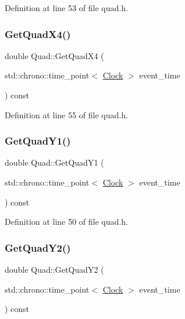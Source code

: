 Definition at line 53 of file quad.\+h.

\mbox{\label{class_quad_a07884076387e255aa09ca8b0ac7ff599}} 
\subsubsection{\texorpdfstring{Get\+Quad\+X4()}{GetQuadX4()}}
{\footnotesize\ttfamily double Quad\+::\+Get\+Quad\+X4 (\begin{DoxyParamCaption}\item[{std\+::chrono\+::time\+\_\+point$<$ \hyperlink{universe_8h_a0ef8d951d1ca5ab3cfaf7ab4c7a6fd80}{Clock} $>$}]{event\+\_\+time }\end{DoxyParamCaption}) const\hspace{0.3cm}{\ttfamily [inline]}}



Definition at line 55 of file quad.\+h.

\mbox{\label{class_quad_ac7b0d27994149531dcd81eacca4e1a5c}} 
\subsubsection{\texorpdfstring{Get\+Quad\+Y1()}{GetQuadY1()}}
{\footnotesize\ttfamily double Quad\+::\+Get\+Quad\+Y1 (\begin{DoxyParamCaption}\item[{std\+::chrono\+::time\+\_\+point$<$ \hyperlink{universe_8h_a0ef8d951d1ca5ab3cfaf7ab4c7a6fd80}{Clock} $>$}]{event\+\_\+time }\end{DoxyParamCaption}) const\hspace{0.3cm}{\ttfamily [inline]}}



Definition at line 50 of file quad.\+h.

\mbox{\label{class_quad_a8f10730993f6c6310f18431a81fb352a}} 
\subsubsection{\texorpdfstring{Get\+Quad\+Y2()}{GetQuadY2()}}
{\footnotesize\ttfamily double Quad\+::\+Get\+Quad\+Y2 (\begin{DoxyParamCaption}\item[{std\+::chrono\+::time\+\_\+point$<$ \hyperlink{universe_8h_a0ef8d951d1ca5ab3cfaf7ab4c7a6fd80}{Clock} $>$}]{event\+\_\+time }\end{DoxyParamCaption}) const\hspace{0.3cm}{\ttfamily [inline]}}



